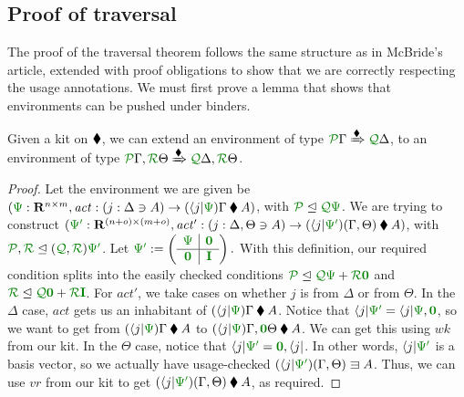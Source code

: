 \documentclass[submission,copyright,creativecommons]{eptcs}
\begin{document}
\subsection{Proof of traversal}
\label{sec:proof-of-traversal}

The proof of the traversal theorem follows the same structure as in
McBride's article, extended with proof obligations to show that we are
correctly respecting the usage annotations. We must first prove a
lemma that shows that environments can be pushed under binders.

\begin{lemma}\label{lem:bind}
  Given a kit on $\mathbin{\blacklozenge}$, we can extend an environment of type
  $\ctx{\Gamma}{P} \subst{\kitrel} \ctx{\Delta}{Q}$, to an environment of type
  $\ctx{\Gamma}{P}, \ctx{\Theta}{R} \subst{\kitrel}
  \ctx{\Delta}{Q}, \ctx{\Theta}{R}$.
\end{lemma}
\begin{proof}
  Let the environment we are given be
  $(\rescomment\Psi : \mathbf R^{n \times m},
  \mathit{act} : (j : \Delta \ni A) \to (\langle j \rvert\rescomment\Psi)\Gamma \kitrel A)$,
  with $\resctx P \subres \resctx Q \rescomment\Psi$.
  We are trying to construct
  $(\rescomment{\Psi'} : \mathbf R^{(n + o) \times (m + o)},
  \mathit{act'} : (j : \Delta, \Theta \ni A) \to
  (\langle j \rvert\rescomment{\Psi'})(\Gamma, \Theta) \kitrel A)$,
  with $\resctx P, \resctx R \subres (\resctx Q, \resctx R) \rescomment{\Psi'}$.
%
  Let \(
    \rescomment{\Psi'} := \left(\begin{array}{c|c}
                                  \rescomment\Psi & \rescomment{\mat 0}
                                  \\ \hline
                                  \rescomment{\mat 0} & \rescomment{\mat I}
                                \end{array}\right).
  \)
  With this definition, our required condition splits into the easily checked
  conditions
  $\resctx P \subres \resctx Q\rescomment\Psi + \resctx R\rescomment{\mat 0}$
  and
  $\resctx R \subres
  \resctx Q\rescomment{\mat 0} + \resctx R\rescomment{\mat I}$.
%
  For $\mathit{act'}$, we take cases on whether $j$ is from $\Delta$ or from
  $\Theta$.
%
  In the $\Delta$ case, $\mathit{act}$ gets us an inhabitant of
  $(\langle j \rvert\rescomment\Psi)\Gamma \kitrel A$.
  Notice that
  $\langle j \rvert\rescomment{\Psi'} =
  \langle j \rvert\rescomment\Psi, \rescomment{\vct 0}$,
  so we want to get from $(\langle j \rvert\rescomment\Psi)\Gamma \kitrel A$ to
  $(\langle j \rvert\rescomment\Psi)\Gamma, \rescomment{\vct 0}\Theta
  \kitrel A$.
  We can get this using $\mathit{wk}$ from our kit.
%
  In the $\Theta$ case, notice that
  $\langle j \rvert\rescomment{\Psi'} = \rescomment{\vct 0}, \langle j \rvert$.
  In other words, $\langle j \rvert\rescomment{\Psi'}$ is a basis vector, so we
  actually have usage-checked
  $(\langle j \rvert\rescomment{\Psi'})(\Gamma, \Theta) \lvar A$.
  Thus, we can use $\mathit{vr}$ from our kit to get
  $(\langle j \rvert\rescomment{\Psi'})(\Gamma, \Theta) \kitrel A$, as required.
\end{proof}
\end{document}
